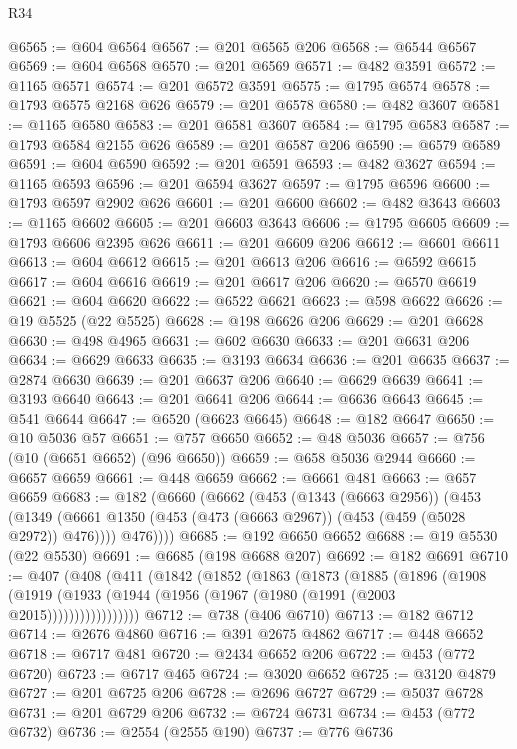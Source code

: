 \begin{lexlean}{R34}
\begin{coremodule}
@6565 := @604 @6564
@6567 := @201 @6565 @206
@6568 := @6544 @6567
@6569 := @604 @6568
@6570 := @201 @6569
@6571 := @482 @3591
@6572 := @1165 @6571
@6574 := @201 @6572 @3591
@6575 := @1795 @6574
@6578 := @1793 @6575 @2168 @626
@6579 := @201 @6578
@6580 := @482 @3607
@6581 := @1165 @6580
@6583 := @201 @6581 @3607
@6584 := @1795 @6583
@6587 := @1793 @6584 @2155 @626
@6589 := @201 @6587 @206
@6590 := @6579 @6589
@6591 := @604 @6590
@6592 := @201 @6591
@6593 := @482 @3627
@6594 := @1165 @6593
@6596 := @201 @6594 @3627
@6597 := @1795 @6596
@6600 := @1793 @6597 @2902 @626
@6601 := @201 @6600
@6602 := @482 @3643
@6603 := @1165 @6602
@6605 := @201 @6603 @3643
@6606 := @1795 @6605
@6609 := @1793 @6606 @2395 @626
@6611 := @201 @6609 @206
@6612 := @6601 @6611
@6613 := @604 @6612
@6615 := @201 @6613 @206
@6616 := @6592 @6615
@6617 := @604 @6616
@6619 := @201 @6617 @206
@6620 := @6570 @6619
@6621 := @604 @6620
@6622 := @6522 @6621
@6623 := @598 @6622
@6626 := @19 @5525 (@22 @5525)
@6628 := @198 @6626 @206
@6629 := @201 @6628
@6630 := @498 @4965
@6631 := @602 @6630
@6633 := @201 @6631 @206
@6634 := @6629 @6633
@6635 := @3193 @6634
@6636 := @201 @6635
@6637 := @2874 @6630
@6639 := @201 @6637 @206
@6640 := @6629 @6639
@6641 := @3193 @6640
@6643 := @201 @6641 @206
@6644 := @6636 @6643
@6645 := @541 @6644
@6647 := @6520 (@6623 @6645)
@6648 := @182 @6647
@6650 := @10 @5036 @57
@6651 := @757 @6650
@6652 := @48 @5036
@6657 := @756 (@10 (@6651 @6652) (@96 @6650))
@6659 := @658 @5036 @2944
@6660 := @6657 @6659
@6661 := @448 @6659
@6662 := @6661 @481
@6663 := @657 @6659
@6683 := @182
    (@6660
      (@6662
        (@453
          (@1343 (@6663 @2956))
          (@453
            (@1349 (@6661 @1350 (@453 (@473 (@6663 @2967)) (@453 (@459 (@5028 @2972)) @476))))
            @476))))
@6685 := @192 @6650 @6652
@6688 := @19 @5530 (@22 @5530)
@6691 := @6685 (@198 @6688 @207)
@6692 := @182 @6691
@6710 := @407
    (@408
      (@411
        (@1842
          (@1852
            (@1863
              (@1873
                (@1885
                  (@1896
                    (@1908
                      (@1919 (@1933 (@1944 (@1956 (@1967 (@1980 (@1991 (@2003 @2015)))))))))))))))))
@6712 := @738 (@406 @6710)
@6713 := @182 @6712
@6714 := @2676 @4860
@6716 := @391 @2675 @4862
@6717 := @448 @6652
@6718 := @6717 @481
@6720 := @2434 @6652 @206
@6722 := @453 (@772 @6720)
@6723 := @6717 @465
@6724 := @3020 @6652
@6725 := @3120 @4879
@6727 := @201 @6725 @206
@6728 := @2696 @6727
@6729 := @5037 @6728
@6731 := @201 @6729 @206
@6732 := @6724 @6731
@6734 := @453 (@772 @6732)
@6736 := @2554 (@2555 @190)
@6737 := @776 @6736

\end{coremodule}
\end{lexlean}
